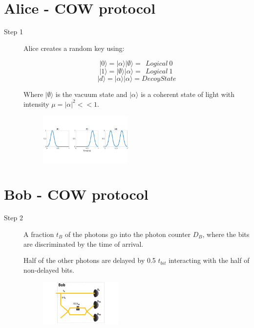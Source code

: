 \documentclass[1000pt]{article}
\newcommand{\mysection}[1]{\section*{\color{black}\sffamily #1}}%
\begin{document}
\mysection{\Huge\textbf{Alice - COW protocol}} \Large \vspace*{1cm}

\begin{description}
  \item[Step 1] Alice creates a random key using:  

$$|0\rangle = |\alpha\rangle |\emptyset\rangle =\ \ Logical\ 0\ $$      
  $$|1\rangle = |\emptyset\rangle |\alpha\rangle =\ \ Logical\ 1\ $$
$$|d\rangle = |\alpha\rangle |\alpha\rangle = Decoy State$$

Where $|\emptyset\rangle$ is the vacuum state and $|\alpha\rangle$ is a coherent state of light with intensity $\mu=|\alpha|^2<<1$.
      
  \begin{figure}[hbt]
    	\centering
    	\includegraphics[width=0.45\textwidth]{./figures/S1.pdf}
        	\label{Simple}
    \end{figure}

\end{description}


\mysection{\Huge\textbf{Bob - COW protocol}} \Large \vspace*{1cm}

\begin{description}
  \item[Step 2] A fraction $t_B$ of the photons go into the photon counter $D_B$, where the bits are discriminated by the time of arrival.

Half of the other photons are delayed by 0.5 $t_{bit}$ interacting with the half of non-delayed bits.
    
    \begin{figure}[hbt]
    	\centering
    	\includegraphics[width=0.4\textwidth]{./figures/B.pdf}
        	\label{bob}
    \end{figure}

\end{description}  
\end{document}
